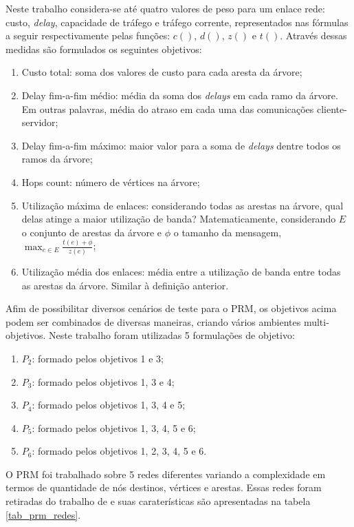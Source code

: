 Neste trabalho considera-se até quatro valores de peso para um enlace rede: custo, \textit{delay}, capacidade de tráfego e tráfego corrente, representados nas fórmulas a seguir respectivamente pelas funções: $c()$, $d()$, $z()$ e $t()$. Através dessas medidas são formulados os seguintes objetivos:

\begin{enumerate} 
	\item Custo total: soma dos valores de custo para cada aresta da árvore;
	\item Delay fim-a-fim médio: média da soma dos \textit{delays} em cada ramo da árvore. Em outras palavras, média do atraso em cada uma das comunicações cliente-servidor;
	\item Delay fim-a-fim máximo: maior valor para a soma de \textit{delays} dentre todos os ramos da árvore;
	\item Hops count: número de vértices na árvore;
	\item Utilização máxima de enlaces: considerando todas as arestas na árvore, qual delas atinge a maior utilização de banda? Matematicamente, considerando $E$ o conjunto de arestas da árvore e $\phi$ o tamanho da mensagem, $\max_{e \in E} \frac{t(e) + \phi}{z(e)}$;
	\item Utilização média dos enlaces: média entre a utilização de banda entre todas as arestas da árvore. Similar à definição anterior.
\end{enumerate}

Afim de possibilitar diversos cenários de teste para o PRM, os objetivos acima podem ser combinados de diversas maneiras, criando vários ambientes multi-objetivos. Neste trabalho foram utilizadas 5 formulações de objetivo:

\begin{enumerate}
	\item $P_2$: formado pelos objetivos 1 e 3;
	\item $P_3$: formado pelos objetivos 1, 3 e 4;
	\item $P_4$: formado pelos objetivos 1, 3, 4 e 5;
	\item $P_5$: formado pelos objetivos 1, 3, 4, 5 e 6;
	\item $P_6$: formado pelos objetivos 1, 2, 3, 4, 5 e 6.
\end{enumerate}

O PRM foi trabalhado sobre 5 redes diferentes variando a complexidade em termos de quantidade de nós destinos, vértices e arestas. Essas redes foram retiradas do trabalho de \cite{Lafeta2016} e suas caraterísticas são apresentadas na tabela \ref{tab_prm_redes}.

